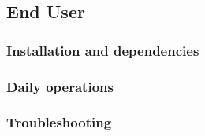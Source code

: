 \subsection{End User}
\subsubsection{Installation and dependencies}
\subsubsection{Daily operations}
\subsubsection{Troubleshooting}
